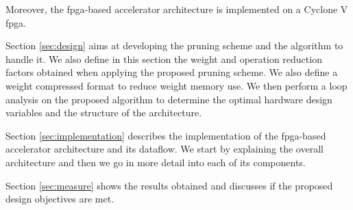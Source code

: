 Moreover, the \acrshort{fpga}-based accelerator architecture is implemented on a Cyclone V \acrshort{fpga}.

Section \ref{sec:design} aims at developing the pruning scheme and the algorithm to handle it. We also define in this section the weight and operation reduction factors obtained when applying the proposed pruning scheme. We also define a weight compressed format to reduce weight memory use. We then perform a loop analysis on the proposed algorithm to determine the optimal hardware design variables and the structure of the architecture.

Section \ref{sec:implementation} describes the implementation of the \acrshort{fpga}-based accelerator architecture and its dataflow. We start by explaining the overall architecture and then we go in more detail into each of its components.

Section \ref{sec:measure} shows the results obtained and discusses if the proposed design objectives are met.
%

%
%

%
%

%
%
\newpage
